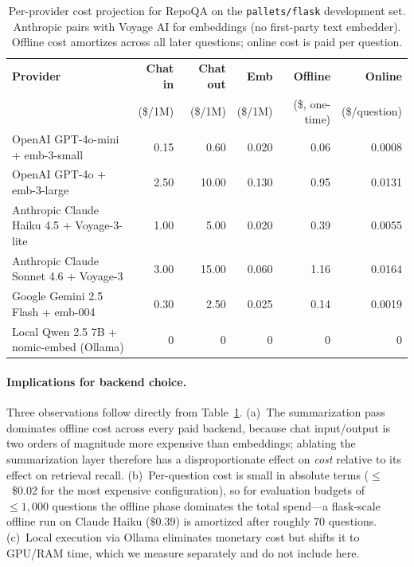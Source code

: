 \documentclass[11pt]{article}
\begin{document}
\begin{table}[h]
\centering
\small
\begin{tabular}{lrrrrr}
\toprule
\textbf{Provider} & \textbf{Chat in} & \textbf{Chat out} & \textbf{Emb} & \textbf{Offline} & \textbf{Online} \\
                  & (\$/1M) & (\$/1M) & (\$/1M) & (\$, one-time) & (\$/question) \\
\midrule
OpenAI GPT-4o-mini + emb-3-small        & 0.15 & 0.60  & 0.020 & 0.06 & 0.0008 \\
OpenAI GPT-4o + emb-3-large             & 2.50 & 10.00 & 0.130 & 0.95 & 0.0131 \\
Anthropic Claude Haiku 4.5 + Voyage-3-lite  & 1.00 & 5.00  & 0.020 & 0.39 & 0.0055 \\
Anthropic Claude Sonnet 4.6 + Voyage-3      & 3.00 & 15.00 & 0.060 & 1.16 & 0.0164 \\
Google Gemini 2.5 Flash + emb-004           & 0.30 & 2.50  & 0.025 & 0.14 & 0.0019 \\
Local Qwen 2.5 7B + nomic-embed (Ollama)    & 0    & 0     & 0     & 0    & 0      \\
\bottomrule
\end{tabular}
\caption{Per-provider cost projection for RepoQA on the \texttt{pallets/flask} development set. Anthropic pairs with Voyage AI for embeddings (no first-party text embedder). Offline cost amortizes across all later questions; online cost is paid per question.}
\label{tab:cost-providers}
\end{table}

\paragraph{Implications for backend choice.} Three observations follow directly from Table~\ref{tab:cost-providers}. (a)~The summarization pass dominates offline cost across every paid backend, because chat input/output is two orders of magnitude more expensive than embeddings; ablating the summarization layer therefore has a disproportionate effect on \emph{cost} relative to its effect on retrieval recall. (b)~Per-question cost is small in absolute terms ($\le$~\$0.02 for the most expensive configuration), so for evaluation budgets of $\le 1{,}000$ questions the offline phase dominates the total spend---a flask-scale offline run on Claude Haiku ($\$0.39$) is amortized after roughly 70 questions. (c)~Local execution via Ollama eliminates monetary cost but shifts it to GPU/RAM time, which we measure separately and do not include here.
\end{document}
